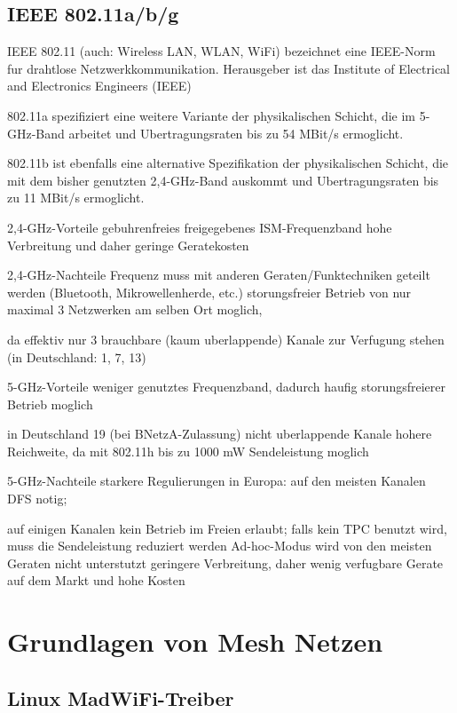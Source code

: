 \subsection{IEEE 802.11a/b/g}


IEEE 802.11 (auch: Wireless LAN, WLAN, WiFi) bezeichnet eine IEEE-Norm fur drahtlose Netzwerkkommunikation. Herausgeber ist das Institute of Electrical and Electronics Engineers (IEEE) 

802.11a spezifiziert eine weitere Variante der physikalischen Schicht, die im 5-GHz-Band arbeitet und Ubertragungsraten bis zu 54 MBit/s ermoglicht. 

802.11b ist ebenfalls eine alternative Spezifikation der physikalischen Schicht, die mit dem bisher genutzten 2,4-GHz-Band auskommt und Ubertragungsraten bis zu 11 MBit/s ermoglicht. 

2,4-GHz-Vorteile 
gebuhrenfreies freigegebenes ISM-Frequenzband 
hohe Verbreitung und daher geringe Geratekosten 

2,4-GHz-Nachteile 
Frequenz muss mit anderen Geraten/Funktechniken geteilt werden (Bluetooth, Mikrowellenherde, etc.) 
storungsfreier Betrieb von nur maximal 3 Netzwerken am selben Ort moglich, 

da effektiv nur 3 brauchbare (kaum uberlappende) Kanale zur Verfugung stehen (in Deutschland: 1, 7, 13) 

5-GHz-Vorteile 
weniger genutztes Frequenzband, dadurch haufig storungsfreierer Betrieb moglich 

in Deutschland 19 (bei BNetzA-Zulassung) nicht uberlappende Kanale 
hohere Reichweite, da mit 802.11h bis zu 1000 mW Sendeleistung moglich 

5-GHz-Nachteile 
starkere Regulierungen in Europa: auf den meisten Kanalen DFS notig; 

auf einigen Kanalen kein Betrieb im Freien erlaubt; falls kein TPC benutzt wird, muss die Sendeleistung reduziert werden 
Ad-hoc-Modus wird von den meisten Geraten nicht unterstutzt 
geringere Verbreitung, daher wenig verfugbare Gerate auf dem Markt und hohe Kosten 

\section{Grundlagen von Mesh Netzen}

\subsection{Linux MadWiFi-Treiber}

